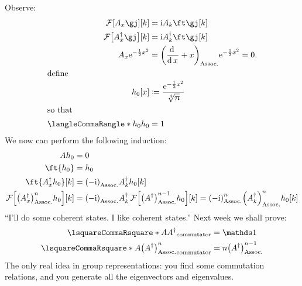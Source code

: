 \documentclass[10pt]{article}
\begin{document}
Observe:
\begin{align*}
\FT\of {A_x \gj}\of k &= \I A_k \ft\gj\of k\\
\FT\of {\adj{A_x} \gj}\of k &= \I \adj{A_k} \ft\gj\of k\\
A_x\E^{-\frac{1}{2}x^2}&=\pa{\derivop x+x}\E^{-\frac{1}{2}x^2}= 0\text{.}\\
\intertext{define}
h_0\of x &\DefineAs \frac{\E^{-\frac{1}{2}x^2}}{\sqrt[4]{\Pi}}\\
\intertext{so that}
\LTwoInner {h_0}{h_0} &= 1
\end{align*}
We now can perform the following induction:
\begin{align*}
Ah_0&=0 \\
\ft{h_0}&= h_0\\
\ft{\adj {A_x} h_0}\of k &=\pa{-\I}\adj{A_k} h_0\of k\\
\FT\of{\pa{\adj{A_x}}^n h_0}\of k &= \pa{-\I} \adj{A_k}\FT\of{\pa{\adj A}^{n-1}h_0}\of k
= \pa{-\I}^n \pa{\adj{A_k}}^n h_0\of k
\end{align*}
``I'll do some coherent states. I like coherent states.'' Next week we shall prove:
\begin{align*}
\commutator A {\adj A} &= \Identity \\
\commutator A {\pa{\adj A}^n} &= n \pa{\adj A}^{n-1}
\end{align*}
The only real idea in group representations: you find some commutation relations, and you generate all the eigenvectors and eigenvalues.
\end{document}
